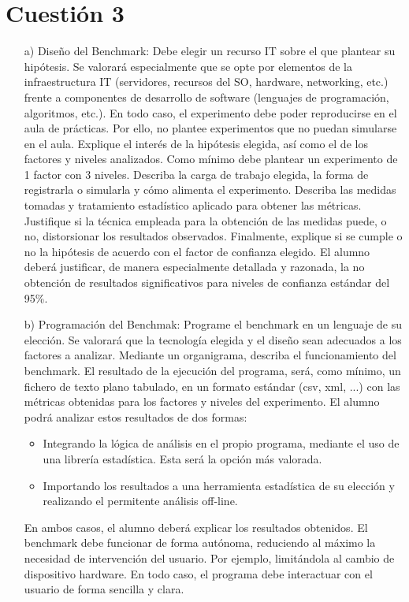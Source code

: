 \documentclass[a4paper, 10pt]{article} %
\begin{document}
\section{Cuestión 3}
\begin{itemize}
\item[a)] Diseño del Benchmark:
Debe elegir un recurso IT sobre el que plantear su hipótesis. Se valorará especialmente que se opte por elementos de la infraestructura IT (servidores, recursos del SO, hardware, networking, etc.) frente a componentes de desarrollo de software (lenguajes de programación, algoritmos, etc.). En todo caso, el experimento debe poder reproducirse en el aula de prácticas. Por ello, no plantee experimentos que no puedan simularse en el aula.
Explique el interés de la hipótesis elegida, así como el de los factores y niveles analizados. Como mínimo debe plantear un experimento de 1 factor con 3 niveles.
Describa la carga de trabajo elegida, la forma de registrarla o simularla y cómo alimenta el experimento.
Describa las medidas tomadas y tratamiento estadístico aplicado para obtener las métricas. Justifique si la técnica empleada para la obtención de las medidas puede, o no, distorsionar los resultados observados.
Finalmente, explique si se cumple o no la hipótesis de acuerdo con el factor de confianza elegido. El alumno deberá justificar, de manera especialmente detallada y razonada, la no obtención de resultados significativos para niveles de confianza estándar del 95\%.
\item[b)] Programación del Benchmak:
Programe el benchmark en un lenguaje de su elección. Se valorará que la tecnología elegida y el diseño sean adecuados a los factores a analizar.
Mediante un organigrama, describa el funcionamiento del benchmark.
El resultado de la ejecución del programa, será, como mínimo, un fichero de texto plano tabulado, en un formato estándar (csv, xml, ...) con las métricas obtenidas para los factores y niveles del experimento.
El alumno podrá analizar estos resultados de dos formas:
\begin{itemize}
\item Integrando la lógica de análisis en el propio programa, mediante el uso de una librería estadística. Esta será la opción más valorada.
\item Importando los resultados a una herramienta estadística de su elección y realizando el permitente análisis off-line.
\end{itemize}
En ambos casos, el alumno deberá explicar los resultados obtenidos.
El benchmark debe funcionar de forma autónoma, reduciendo al máximo la necesidad de intervención del usuario. Por ejemplo, limitándola al cambio de dispositivo hardware. En todo caso, el programa debe interactuar con el usuario de forma sencilla y clara.

\end{itemize}
\end{document}
